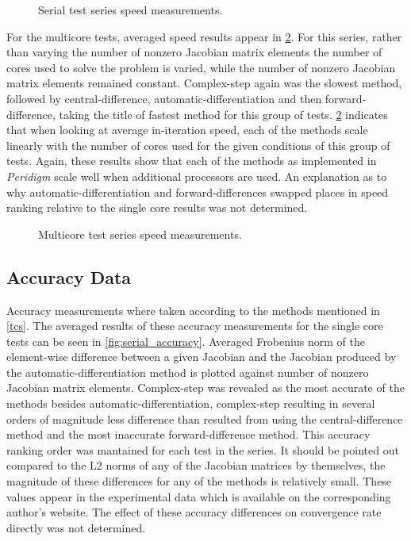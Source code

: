 \documentclass[preprint,12pt]{elsarticle}
\begin{document}
\begin{figure}[h]
  \centering
  \scalebox{.7}{}
  \caption{Serial test series speed measurements.}
  \label{fig:serial_speed}
\end{figure}

For the multicore tests, averaged speed results appear in \ref{fig:multi_speed}. For this series,
rather than varying the number of nonzero Jacobian matrix elements the number of cores used to
solve the problem is varied, while the number of nonzero Jacobian matrix elements remained constant.
Complex-step again was the slowest method, followed by central-difference, automatic-differentiation
and then forward-difference, taking the title of fastest method for this group of tests.
\ref{fig:multi_speed} indicates that when looking at average in-iteration speed, each of the
methods scale linearly with the number of cores used for the given conditions of this group of
tests. Again, these results show that each of the methods as implemented in \emph{Peridigm} scale
well when additional processors are used. An explanation as to why automatic-differentiation and
forward-differences swapped places in speed ranking relative to the single core results was not
determined. 

\begin{figure}[h]
  \centering
  \scalebox{.7}{}
  \caption{Multicore test series speed measurements.}
  \label{fig:multi_speed}
\end{figure}

\subsection{Accuracy Data}
Accuracy measurements where taken according to the methods mentioned in \ref{tcs}. The averaged
results of these accuracy measurements for the single core tests can be seen in
\ref{fig:serial_accuracy}. Averaged Frobenius norm of the element-wise difference between a given
Jacobian and the Jacobian produced by the automatic-differentiation method is plotted against number
of nonzero Jacobian matrix elements. Complex-step was revealed as the most accurate of the methods
besides automatic-differentiation, complex-step resulting in several orders of magnitude less
difference than resulted from using the central-difference method and the most inaccurate
forward-difference method. This accuracy ranking order was mantained for each test in the series. It
should be pointed out compared to the L2 norms of any of the Jacobian matrices by themselves, the
magnitude of these differences for any of the methods is relatively small. These values appear in
the experimental data which is available on the corresponding author's website. The effect of these
accuracy differences on convergence rate directly was not determined.
\end{document}
